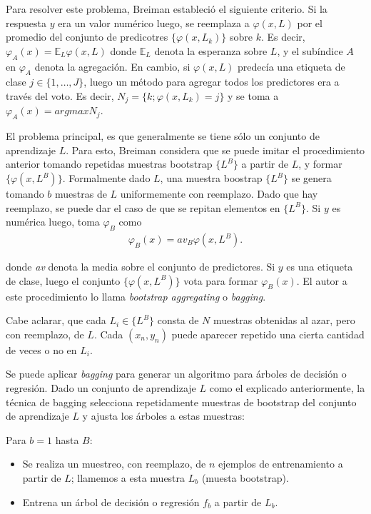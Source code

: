 	Para resolver este problema, Breiman estableció el siguiente criterio. Si la respuesta $y$ era un valor numérico luego, se reemplaza a $\varphi(x,L)$ por el promedio del conjunto de predicotres $ \{ \varphi(x, L_k) \} $ sobre $k$. Es decir, $\varphi_A(x) = \mathbb{E}_L\varphi(x,L)$ donde $\mathbb{E}_L$ denota la esperanza sobre $L$, y el subíndice $A$ en $\varphi_A$ denota la agregación. En cambio, si $\varphi(x,L)$ predecía una etiqueta de clase $j \in \{ 1,\dots, J \} $, luego un método para agregar todos los predictores era a través del voto. Es decir, $N_j = \{ k;\varphi(x, L_k) = j \}$ y se toma a $\varphi_A(x) = argmax N_j$.

	El problema principal, es que generalmente se tiene sólo un conjunto de aprendizaje $L$. Para esto, Breiman considera que se puede imitar el procedimiento anterior tomando repetidas muestras bootstrap $\{ L^{B} \}$ a partir de $L$, y formar $\{ \varphi(x, L^{B}) \}$. Formalmente dado $L$, una muestra boostrap $\{ L^{B} \}$ se genera tomando $b$ muestras de $L$ uniformemente con reemplazo. Dado que hay reemplazo, se puede dar el caso de que se repitan elementos en $\{ L^{B} \}$. Si $y$ es numérica luego, toma $\varphi_B$ como
	\begin{align*}
		\varphi_B(x) = av_B\varphi(x,L^{B}).
	\end{align*}

	donde \textit{av} denota la media sobre el conjunto de predictores. Si $y$ es una etiqueta de clase, luego el conjunto  $\{ \varphi(x, L^{B}) \}$ vota para formar $\varphi_B(x)$. El autor a este procedimiento lo llama  \textit{bootstrap aggregating} o \textit{bagging}.

	Cabe aclarar, que cada $L_i \in \{ L^{B} \}$ consta de $N$ muestras obtenidas al azar, pero con reemplazo, de $L$. Cada $(x_n, y_n)$ puede aparecer repetido una cierta cantidad de veces o no en $L_i$.

	Se puede aplicar \textit{bagging} para generar un algoritmo para árboles de decisión o regresión. Dado un conjunto de aprendizaje $L$ como el explicado anteriormente, la técnica de bagging selecciona repetidamente muestras de bootstrap del conjunto de aprendizaje $L$ y ajusta los árboles a estas muestras:

	Para $b=1$ hasta $B$:
	\begin{itemize}
		\item Se realiza un muestreo, con reemplazo, de $n$ ejemplos de entrenamiento a partir de $L$; llamemos a esta muestra $L_b$ (muesta bootstrap).
		\item Entrena un árbol de decisión o regresión $f_b$ a partir de $L_b$.
	\end{itemize}

